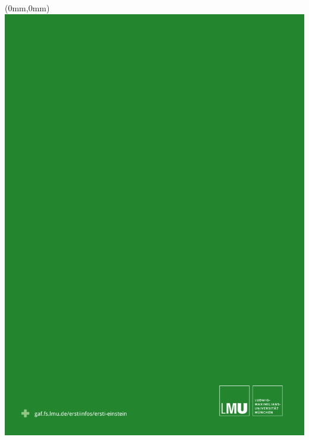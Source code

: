 \documentclass[twoside,12pt,parskip=half-]{scrartcl}
\begin{document}
\thispagestyle{empty}
\begin{textblock*}{\paperwidth}(0mm,0mm)
   \noindent\includegraphics[width=\paperwidth,height=\paperheight]{back}
\end{textblock*}
\mbox{}
\end{document}
